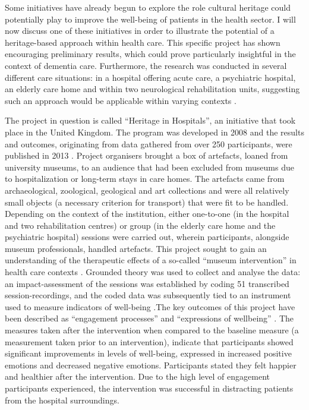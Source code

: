 	Some initiatives have already begun to explore the role cultural heritage could potentially play to improve the well-being of patients in the health sector. I will now discuss one of these initiatives in order to illustrate the potential of a heritage-based approach within health care. This specific project has shown encouraging preliminary results, which could prove particularly insightful in the context of dementia care. Furthermore, the research was conducted in several different care situations: in a hospital offering acute care, a psychiatric hospital, an elderly care home and within two neurological rehabilitation units, suggesting such an approach would be applicable within varying contexts \parencite[231--232]{AnderE_2013}.	
	
	
	The project in question is called “Heritage in Hospitals”, an initiative that took place in the United Kingdom. The program was developed in 2008 and the results and outcomes, originating from data gathered from over 250 participants, were published in 2013 \parencite{AnderE_2013}. Project organisers brought a box of artefacts, loaned from university museums, to an audience that had been excluded from museums due to hospitalization or long-term stays in care homes. The artefacts came from archaeological, zoological, geological and art collections and were all relatively small objects (a necessary criterion for transport) that were fit to be handled. Depending on the context of the institution, either one-to-one (in the hospital and two rehabilitation centres) or group (in the elderly care home and the psychiatric hospital) sessions were carried out, wherein participants, alongside museum professionals, handled artefacts.	
	This project sought to gain an understanding of the therapeutic effects of a so-called “museum intervention” in health care contexts \parencite[230--232]{AnderE_2013}. Grounded theory was used to collect and analyse the data: an impact-assessment of the sessions was established by coding 51 transcribed session-recordings, and the coded data was subsequently tied to an instrument used to measure indicators of well-being \parencite[237--239]{AnderE_2013}.The key outcomes of this project have been described as “engagement processes” and “expressions of wellbeing” \parencite[234]{AnderE_2013}. The measures taken after the intervention when compared to the baseline measure (a measurement taken prior to an intervention), indicate that participants showed significant improvements in  levels of well-being, expressed in increased positive emotions and decreased negative emotions. Participants stated they felt happier and healthier after the intervention. Due to the high level of engagement participants experienced, the intervention was successful in distracting patients from the hospital surroundings. 
	

